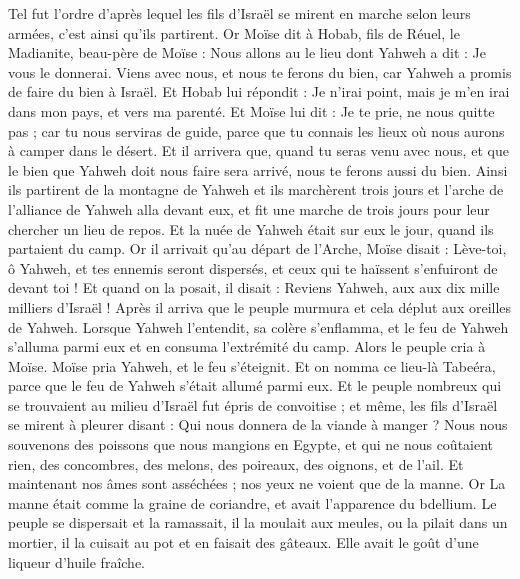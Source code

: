 \begin{multicols}{2}
Tel fut l'ordre d'après lequel les fils d'Israël se mirent en marche selon leurs armées, c'est ainsi qu'ils partirent.
Or Moïse dit à Hobab, fils de Réuel, le Madianite, beau-père de Moïse : Nous allons au le lieu dont Yahweh a dit : Je vous le donnerai. Viens avec nous, et nous te ferons du bien, car Yahweh a promis de faire du bien à Israël.
Et Hobab lui répondit : Je n'irai point, mais je m'en irai dans mon pays, et vers ma parenté.
Et Moïse lui dit : Je te prie, ne nous quitte pas ; car tu nous serviras de guide, parce que tu connais les lieux où nous aurons à camper dans le désert.
Et il arrivera que, quand tu seras venu avec nous, et que le bien que Yahweh doit nous faire sera arrivé, nous te ferons aussi du bien.
Ainsi ils partirent de la montagne de Yahweh et ils marchèrent trois jours et l'arche de l'alliance de Yahweh alla devant eux, et fit une marche de trois jours pour leur chercher un lieu de repos.
Et la nuée de Yahweh était sur eux le jour, quand ils partaient du camp.
Or il arrivait qu'au départ de l'Arche, Moïse disait : Lève-toi, ô Yahweh, et tes ennemis seront dispersés, et ceux qui te haïssent s'enfuiront de devant toi !
Et quand on la posait, il disait : Reviens Yahweh, aux aux dix mille milliers d'Israël !
\VerseOne{}Après il arriva que le peuple murmura et cela déplut aux oreilles de Yahweh. Lorsque Yahweh l'entendit, sa colère s'enflamma, et le feu de Yahweh s'alluma parmi eux et en consuma l'extrémité du camp.
Alors le peuple cria à Moïse. Moïse pria Yahweh, et le feu s'éteignit.
Et on nomma ce lieu-là Tabeéra, parce que le feu de Yahweh s'était allumé parmi eux.
Et le peuple nombreux qui se trouvaient au milieu d'Israël fut épris de convoitise ; et même, les fils d'Israël se mirent à pleurer disant : Qui nous donnera de la viande à manger ?
Nous nous souvenons des poissons que nous mangions en Egypte, et qui ne nous coûtaient rien, des concombres, des melons, des poireaux, des oignons, et de l'ail.
Et maintenant nos âmes sont asséchées ; nos yeux ne voient que de la manne.
Or La manne était comme la graine de coriandre, et avait l'apparence du bdellium.
Le peuple se dispersait et la ramassait, il la moulait aux meules, ou la pilait dans un mortier, il la cuisait au pot et en faisait des gâteaux. Elle avait le goût d'une liqueur d'huile fraîche.

\end{multicols}
